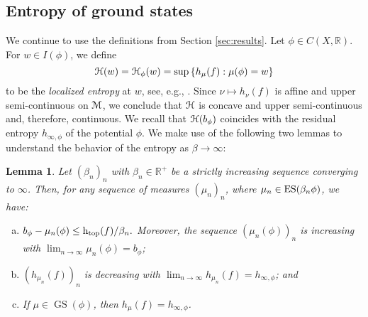 \documentclass[11pt, reqno]{amsart}
\newtheorem{lemma}[theorem]{Lemma}
\DeclareMathOperator{\GS}{GS}
\newcommand{\cM}{\EuScript{M}}
\newcommand{\cH}{\EuScript{H}}
\newcommand{\bR}{{\mathbb R}}
\def\ES{{\rm ES}}
\begin{document}
\subsection{Entropy of ground states}\label{sec: ground states}
We continue to use the definitions from Section \ref{sec:results}.
Let $\phi\in C(X,\bR)$. 
For  $w\in I(\phi)$, we define
$$
\cH(w)=\cH_\phi(w)=\sup \left\{h_\mu(f): \mu(\phi)=w\right\}
$$
to be the {\em localized entropy} at $w$, see, e.g., \cite{Je,KW1}. Since $\nu\mapsto h_\nu(f)$ is affine and upper semi-continuous on $\cM$, we conclude that $ \cH$ is concave and upper semi-continuous and, therefore, continuous.  We recall that $\cH(b_\phi)$  coincides with the residual entropy $h_{\infty,\phi}$ of the potential $\phi$.
We make use of the following two lemmas to understand the behavior of the entropy as $\beta\rightarrow\infty$:
\begin{lemma}\label{lem1}
Let $(\beta_n)_n$ with $ \beta_n\in\bR^+$ be a strictly increasing sequence converging to $\infty$. Then, for any sequence of measures $(\mu_n)_n$, where $\mu_n\in \ES(\beta_n\phi)$, we have:
\begin{enumerate}[(a)]
\item $b_\phi-\mu_n(\phi)\leq {\text h_{{\rm top}}}(f)/ \beta_n.$  Moreover, the sequence $(\mu_n(\phi))_n$ is increasing with $\lim_{n\to\infty} \mu_n(\phi)=b_\phi$;
\item $(h_{\mu_n}(f))_n$ is decreasing with $\lim_{n\to\infty} h_{\mu_n}(f)=h_{\infty,\phi}$; and
\item If $\mu\in \GS(\phi)$, then $h_\mu(f)=h_{\infty,\phi}$.
\end{enumerate}
\end{lemma}
\end{document}
